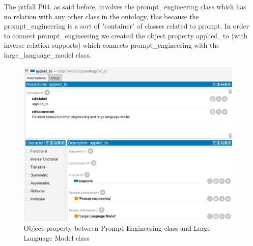 The pitfall P04, as said before, involves the prompt\_engineering class which has no relation with any other class in the ontology, this because the prompt\_engineering is a sort of "container" of classes related to prompt. In order to connect prompt\_engineering we created the object property applied\_to (with inverse relation supports) which connects prompt\_engineering with the large\_language\_model class.

\begin{figure}[H]
    \centering
    \includegraphics[width=0.7\linewidth]{Figures/fig_78.png}
    \caption{Object property between Prompt Engineering class and Large Language Model class}
    \label{fig:enter-label}
\end{figure}

